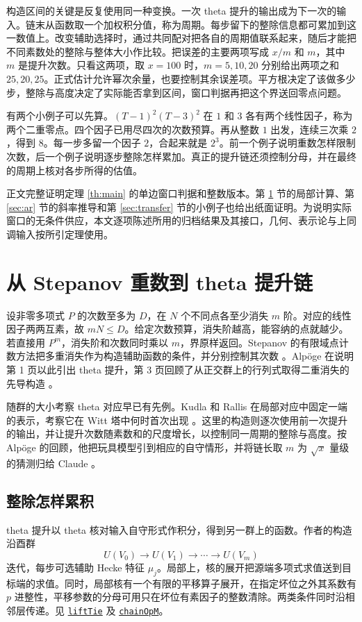 \documentclass[UTF8,fontset=none,a4paper,11pt]{ctexart}
\theoremstyle{definition}
\newcommand{\src}[3]{\href{https://github.com/leanprover-community/riemann-hypothesis/blob/23aebbb302010b292314d406aa97f7901d698634/src/#1.lean\#L#2}{#3}}
\begin{document}
构造区间的关键是反复使用同一种变换。一次 theta 提升的输出成为下一次的输入。链末从函数取一个加权积分值，称为周期。每步留下的整除信息都可累加到这一数值上。改变辅助选择时，通过共同配对把各自的周期值联系起来，随后才能把不同素数处的整除与整体大小作比较。把误差的主要两项写成 $x/m$ 和 $m$，其中 $m$ 是提升次数。只看这两项，取 $x=100$ 时，$m=5,10,20$ 分别给出两项之和 $25,20,25$。正式估计允许幂次余量，也要控制其余误差项。平方根决定了该做多少步，整除与高度决定了实际能否拿到区间，窗口判据再把这个界送回零点问题。

有两个小例子可以先算。$(T-1)^2(T-3)^2$ 在 $1$ 和 $3$ 各有两个线性因子，称为两个二重零点。四个因子已用尽四次的次数预算。再从整数 $1$ 出发，连续三次乘 $2$，得到 $8$。每一步多留一个因子 $2$，合起来就是 $2^3$。前一个例子说明重数怎样限制次数，后一个例子说明逐步整除怎样累加。真正的提升链还须控制分母，并在最终的周期上核对各步所得的估值。

正文完整证明定理 \ref{th:main} 的单边窗口判据和整数版本。第 \ref{sec:theta} 节的局部计算、第 \ref{sec:ar} 节的斜率推导和第 \ref{sec:transfer} 节的小例子也给出纸面证明。为说明实际窗口的无条件供应，本文逐项陈述所用的归档结果及其接口，几何、表示论与上同调输入按所引定理使用。

\section{从 Stepanov 重数到 theta 提升链}\label{sec:theta}
设非零多项式 $P$ 的次数至多为 $D$，在 $N$ 个不同点各至少消失 $m$ 阶。对应的线性因子两两互素，故 $mN\le D$。给定次数预算，消失阶越高，能容纳的点就越少。若直接用 $P^m$，消失阶和次数同时乘以 $m$，界原样返回。Stepanov 的有限域点计数方法把多重消失作为构造辅助函数的条件，并分别控制其次数 \cite{stepanov}。Alpöge 在说明第 1 页以此引出 theta 提升，第 3 页回顾了从正交群上的行列式取得二重消失的先导构造 \cite{al}。

随群的大小考察 theta 对应早已有先例。Kudla 和 Rallis 在局部对应中固定一端的表示，考察它在 Witt 塔中何时首次出现 \cite{kudlarallis}。这里的构造则逐次使用前一次提升的输出，并让提升次数随素数和的尺度增长，以控制同一周期的整除与高度。按 Alpöge 的回顾，他把玩具模型引到相应的自守情形，并将链长取 $m$ 为 $\sqrt{x}$ 量级的猜测归给 Claude \cite[第 1 页]{al}。

\subsection{整除怎样累积}
theta 提升以 theta 核对输入自守形式作积分，得到另一群上的函数。作者的构造沿酉群
\[
 U(V_0)\longrightarrow U(V_1)\longrightarrow\cdots\longrightarrow U(V_m)
\]
迭代，每步可选辅助 Hecke 特征 $\mu_j$。局部上，核的展开把源端多项式求值送到目标端的求值。同时，局部核有一个有限的平移算子展开，在指定坏位之外其系数有 $p$ 进整性，平移参数的分母可用只在坏位有素因子的整数清除。两类条件同时沿相邻层传递。见
\src{Formalism/SharpRestriction/GlobalSchurBounds/GL3Theta}{575}{\texttt{liftTie}}
及 \src{Formalism/ThetaLiftIndependence/Statement}{52}{\texttt{chainOpM}}。
\end{document}
